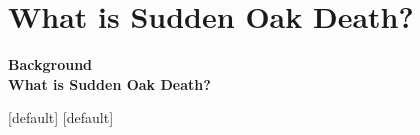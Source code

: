 \documentclass{beamer}\usepackage[]{graphicx}\usepackage[]{color}
\begin{document}
\section{What is Sudden Oak Death?}
\begin{frame}
	\begin{center}
		\begin{shaded}
		 	\Large{\bf \sc Background}\\
		 	\Large{\bf What is Sudden Oak Death?}
	 	\end{shaded}
	\end{center}
\end{frame}

[default]
[default]

\end{document}
